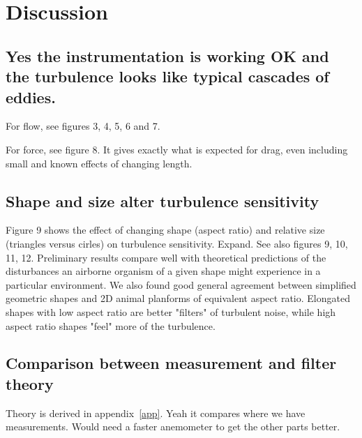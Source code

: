 \section{Discussion}

\subsection{Yes the instrumentation is working OK and the turbulence looks like typical cascades of eddies.}
For flow, see figures 3, 4, 5, 6 and 7. 

For force, see figure 8.  It gives exactly what is expected for drag, even including small and known effects of changing length.

\subsection{Shape and size alter turbulence sensitivity}
Figure 9 shows the effect of changing shape (aspect ratio) and relative size (triangles versus cirles) on turbulence sensitivity.  Expand. See also figures 9, 10, 11, 12. Preliminary results compare well with theoretical predictions of the disturbances an airborne organism of a given shape might experience in a particular environment.  We also found good general agreement between simplified geometric shapes and 2D animal planforms of equivalent aspect ratio.  Elongated shapes with low aspect ratio are better "filters" of turbulent noise, while high aspect ratio shapes "feel" more of the turbulence.

\subsection{Comparison between measurement and filter theory}
Theory is derived in appendix~\ref{app}.  Yeah it compares where we have measurements.  Would need a faster anemometer to get the other parts better. 

